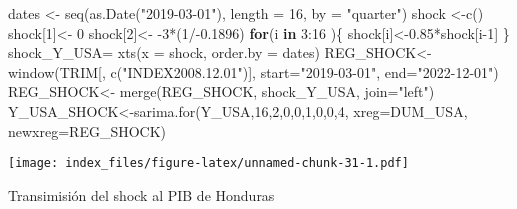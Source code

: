 \documentclass[
]{book}
\newenvironment{Shaded}{\begin{snugshade}}{\end{snugshade}}
\newcommand{\AttributeTok}[1]{\textcolor[rgb]{0.77,0.63,0.00}{#1}}
\newcommand{\ControlFlowTok}[1]{\textcolor[rgb]{0.13,0.29,0.53}{\textbf{#1}}}
\newcommand{\DecValTok}[1]{\textcolor[rgb]{0.00,0.00,0.81}{#1}}
\newcommand{\FloatTok}[1]{\textcolor[rgb]{0.00,0.00,0.81}{#1}}
\newcommand{\FunctionTok}[1]{\textcolor[rgb]{0.00,0.00,0.00}{#1}}
\newcommand{\NormalTok}[1]{#1}
\newcommand{\OtherTok}[1]{\textcolor[rgb]{0.56,0.35,0.01}{#1}}
\newcommand{\SpecialCharTok}[1]{\textcolor[rgb]{0.00,0.00,0.00}{#1}}
\newcommand{\StringTok}[1]{\textcolor[rgb]{0.31,0.60,0.02}{#1}}
\begin{document}
\begin{Shaded}
\begin{Highlighting}[]
\NormalTok{dates }\OtherTok{\textless{}{-}} \FunctionTok{seq}\NormalTok{(}\FunctionTok{as.Date}\NormalTok{(}\StringTok{"2019{-}03{-}01"}\NormalTok{), }\AttributeTok{length =} \DecValTok{16}\NormalTok{, }\AttributeTok{by =} \StringTok{"quarter"}\NormalTok{)}
\NormalTok{shock }\OtherTok{\textless{}{-}}\FunctionTok{c}\NormalTok{()}
\NormalTok{shock[}\DecValTok{1}\NormalTok{]}\OtherTok{\textless{}{-}} \DecValTok{0}
\NormalTok{shock[}\DecValTok{2}\NormalTok{]}\OtherTok{\textless{}{-}} \SpecialCharTok{{-}}\DecValTok{3}\SpecialCharTok{*}\NormalTok{(}\DecValTok{1}\SpecialCharTok{/{-}}\FloatTok{0.1896}\NormalTok{)}
\ControlFlowTok{for}\NormalTok{(i }\ControlFlowTok{in} \DecValTok{3}\SpecialCharTok{:}\DecValTok{16}\NormalTok{ )\{}
\NormalTok{  shock[i]}\OtherTok{\textless{}{-}}\FloatTok{0.85}\SpecialCharTok{*}\NormalTok{shock[i}\DecValTok{{-}1}\NormalTok{]}
\NormalTok{\}}
\NormalTok{shock\_Y\_USA}\OtherTok{=} \FunctionTok{xts}\NormalTok{(}\AttributeTok{x =}\NormalTok{ shock, }\AttributeTok{order.by =}\NormalTok{ dates) }
\NormalTok{REG\_SHOCK}\OtherTok{\textless{}{-}}\FunctionTok{window}\NormalTok{(TRIM[, }\FunctionTok{c}\NormalTok{(}\StringTok{"INDEX2008.12.01"}\NormalTok{)], }\AttributeTok{start=}\StringTok{"2019{-}03{-}01"}\NormalTok{, }\AttributeTok{end=}\StringTok{"2022{-}12{-}01"}\NormalTok{)}
\NormalTok{REG\_SHOCK}\OtherTok{\textless{}{-}} \FunctionTok{merge}\NormalTok{(REG\_SHOCK, shock\_Y\_USA, }\AttributeTok{join=}\StringTok{"left"}\NormalTok{)}
\NormalTok{Y\_USA\_SHOCK}\OtherTok{\textless{}{-}}\FunctionTok{sarima.for}\NormalTok{(Y\_USA,}\DecValTok{16}\NormalTok{,}\DecValTok{2}\NormalTok{,}\DecValTok{0}\NormalTok{,}\DecValTok{0}\NormalTok{,}\DecValTok{1}\NormalTok{,}\DecValTok{0}\NormalTok{,}\DecValTok{0}\NormalTok{,}\DecValTok{4}\NormalTok{, }\AttributeTok{xreg=}\NormalTok{DUM\_USA, }\AttributeTok{newxreg=}\NormalTok{REG\_SHOCK) }
\end{Highlighting}
\end{Shaded}

\texttt{[image: index\_files/figure-latex/unnamed-chunk-31-1.pdf]}

Transimisión del shock al PIB de Honduras
\end{document}
